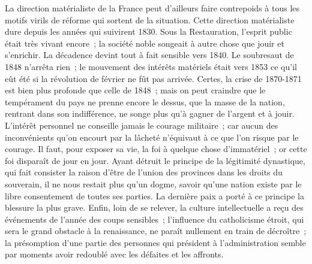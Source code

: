 \documentclass[french,twoside]{book} %
\begin{document}
La direction matérialiste de la France peut d’ailleurs faire contrepoids à tous les motifs virils de réforme qui sortent de la situation. Cette direction matérialiste dure depuis les années qui suivirent 1830. Sous la Restauration, l’esprit public était très vivant encore ; la société noble songeait à autre chose que jouir et s’enrichir. La décadence devint tout à fait sensible vers 1840. Le soubresaut de 1848 n’arrêta rien ; le mouvement des intérêts matériels était vers 1853 ce qu’il eût été si la révolution de février ne fût pas arrivée. Certes, la crise de 1870-1871 est bien plus profonde que celle de 1848 ; mais on peut craindre que le tempérament du pays ne prenne encore le dessus, que la masse de la nation, rentrant dans son indifférence, ne songe plus qu’à gagner de l’argent et à jouir. L’intérêt personnel ne conseille jamais le courage militaire ; car aucun des inconvénients qu’on encourt par la lâcheté n’équivaut à ce que l’on risque par le courage. Il faut, pour exposer sa vie, la foi à quelque chose d’immatériel ; or cette foi disparaît de jour en jour. Ayant détruit le principe de la légitimité dynastique, qui fait consister la raison d’être de l’union des provinces dans les droits du souverain, il ne nous restait plus qu’un dogme, savoir qu’une nation existe par le libre consentement de toutes ses parties. La dernière paix a porté à ce principe la blessure la plus grave. Enfin, loin de se relever, la culture intellectuelle a reçu des événements de l’année des coups sensibles ; l’influence du catholicisme étroit, qui sera le grand obstacle à la renaissance, ne paraît nullement en train de décroître ; la présomption d’une partie des personnes qui président à l’administration semble par moments avoir redoublé avec les défaites et les affronts.\par
\end{document}
